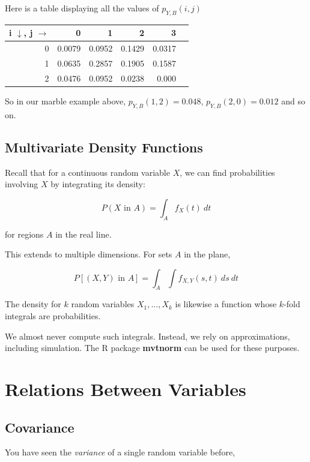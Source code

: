 Here is a table displaying all the values of $p_{Y,B}(i,j)$

\begin{tabular}{|r|r|r|r|r|r|}
\hline
i $\downarrow$, j $\rightarrow$ & 0 & 1 & 2 & 3 \\ \hline
0 & 0.0079 & 0.0952 & 0.1429 & 0.0317 \\ \hline
1 & 0.0635 & 0.2857 & 0.1905 & 0.1587 \\ \hline
2 & 0.0476 & 0.0952 & 0.0238 & 0.000 \\ \hline
\end{tabular}

So in our marble example above, $p_{Y,B}(1,2) = 0.048$, $p_{Y,B}(2,0) =
0.012$ and so on.

\subsection{Multivariate Density Functions}

Recall that for a continuous random variable $X$, we can find
probabilities involving $X$ by integrating its density:

\begin{equation}
P(X \textrm{ in } A) = \int_{A} f_X(t) ~ dt
\end{equation}

for regions $A$ in the real line.

This extends to multiple dimensions.  For sets $A$ in the plane,

\begin{equation}
P[(X,Y) \textrm{ in } A] = \int_{A} \int f_{X,Y}(s,t) ~ ds  ~ dt
\end{equation}

The density for $k$ random variables $X_1,...,X_k$ is likewise a
function whose $k$-fold integrals are probabilities.  

We almost never compute such integrals.  Instead, we rely on
approximations, including simulation.  The R package \textbf{mvtnorm}
can be used for these purposes.

\section{Relations Between Variables}

\subsection{Covariance}

You have seen the \textit{variance} of a single random variable before,

